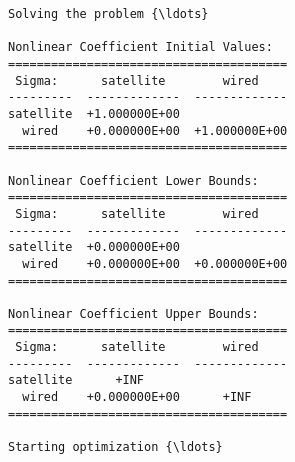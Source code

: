     \begin{Verbatim}[commandchars=\\\{\}]
Solving the problem {\ldots}

Nonlinear Coefficient Initial Values:
=======================================
 Sigma:      satellite        wired
---------  -------------  -------------
satellite  +1.000000E+00
  wired    +0.000000E+00  +1.000000E+00
=======================================

Nonlinear Coefficient Lower Bounds:
=======================================
 Sigma:      satellite        wired
---------  -------------  -------------
satellite  +0.000000E+00
  wired    +0.000000E+00  +0.000000E+00
=======================================

Nonlinear Coefficient Upper Bounds:
=======================================
 Sigma:      satellite        wired
---------  -------------  -------------
satellite      +INF
  wired    +0.000000E+00      +INF
=======================================

Starting optimization {\ldots}


\end{Verbatim}
